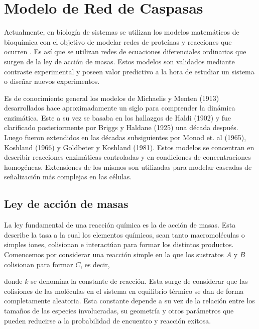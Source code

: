 \chapter{Modelo de Red de Caspasas}
\label{cap:modelo}

Actualmente, en biología de sistemas se utilizan los modelos matemáticos de bioquímica con el objetivo de modelar redes de proteínas y reacciones que ocurren . Es así que se utilizan redes de ecuaciones diferenciales ordinarias que surgen de la ley de acción de masas\cite{Chen2010}. Estos modelos son validados mediante contraste experimental y poseen valor predictivo a la hora de estudiar un sistema o diseñar nuevos experimentos.


Es de conocimiento general los modelos de Michaelis y Menten (1913) desarrollados hace aproximadamente un siglo para comprender la dinámica enzimática. Este a su vez se basaba en los hallazgos de Haldi (1902) y fue clarificado posteriormente por Briggs y Haldane (1925) una década después. Luego fueron extendidos en las décadas subsiguientes por Monod et. al (1965), Koshland (1966) y Goldbeter y Koshland (1981). Estos modelos se concentran en describir reacciones enzimáticas controladas  y en condiciones de concentraciones homogéneas\cite{Chen2010}. Extensiones de los mismos son utilizadas para modelar cascadas de señalización más complejas en las células.


\section{Ley de acción de masas}

La ley fundamental de una reacción química es la de acción de masas. Esta describe la tasa a la cual los elementos químicos, sean tanto macromoléculas o simples iones, colisionan e interactúan para formar los distintos productos. Comencemos por considerar una reacción simple en la que los sustratos $A$ y $B$ colisionan para formar $C$, es decir,

\begin{center}
\end{center}

\noindent donde $k$ se denomina la constante de reacción. Esta surge de considerar que las colisiones de las moléculas en el sistema en equilibrio térmico se dan de forma completamente aleatoria. Esta constante depende a su vez de la relación entre los tamaños de las especies involucradas, su geometría y otros parámetros que pueden reducirse a la probabilidad de encuentro y reacción exitosa\cite{Gillespie1977}.

